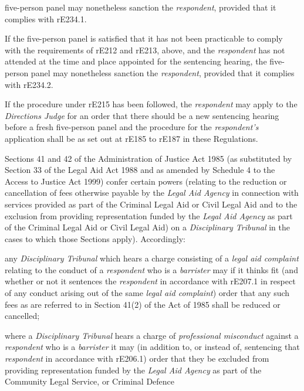 five-person panel may nonetheless sanction the \emph{respondent},
provided that it complies with rE234.1.\\
\par
If the five-person panel is satisfied that it has not been practicable
to comply with the requirements of rE212 and rE213, above, and
the \emph{respondent} has not attended at the time and place appointed
for the sentencing hearing, the five-person panel may nonetheless
sanction the \emph{respondent}, provided that it complies with
rE234.2.\\
\par
If the procedure under rE215 has been followed,
the \emph{respondent} may apply to the \emph{Directions Judge} for an
order that there should be a new sentencing hearing before a fresh
five-person panel and the procedure for
the \emph{respondent's }application shall be as set out at rE185 to
rE187 in these Regulations.\\
\par
Sections 41 and 42 of the Administration of Justice Act 1985 (as
substituted by Section 33 of the Legal Aid Act 1988 and as amended by
Schedule 4 to the Access to Justice Act 1999) confer certain powers
(relating to the reduction or cancellation of fees otherwise payable by
the \emph{Legal Aid Agency }in connection with services provided as part
of the Criminal Legal Aid or Civil Legal Aid and to the exclusion from
providing representation funded by the \emph{Legal Aid Agency }as part
of the Criminal Legal Aid or Civil Legal Aid) on a \emph{Disciplinary
Tribunal }in the cases to which those Sections apply). Accordingly:\\\nl \item any \emph{Disciplinary Tribunal} which hears a charge consisting of
a \emph{legal aid complaint} relating to the conduct of
a \emph{respondent} who is a \emph{barrister} may if it thinks fit (and
whether or not it sentences the \emph{respondent} in accordance with
rE207.1 in respect of any conduct arising out of the same \emph{legal
aid complaint}) order that any such fees as are referred to in Section
41(2) of the Act of 1985 shall be reduced or cancelled;\item where a \emph{Disciplinary Tribunal} hears a charge
of \emph{professional misconduct} against a \emph{respondent} who is
a \emph{barrister} it may (in addition to, or instead of, sentencing
that \emph{respondent} in accordance with rE206.1) order that they be
excluded from providing representation funded by the \emph{Legal Aid
Agency} as part of the Community Legal Service, or Criminal Defence
